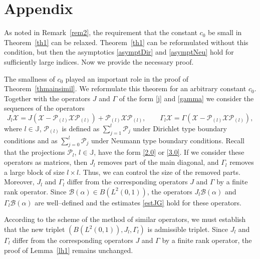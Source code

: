 \documentclass[11pt,centertags,reqno,twoside]{amsart}
\numberwithin{equation}{section}
\theoremstyle{definition}
\theoremstyle{remark}
\begin{document}
\section{Appendix}

As noted in Remark~\ref{rem2}, the requirement that the constant $c_0$ be small in
Theorem~\ref{th1} can be relaxed. Theorem~\ref{th1} can be reformulated without this
condition, but then the asymptotics \eqref{asymptDir} and \eqref{asymptNeu} hold
for sufficiently large indices. Now we provide the necessary proof.

The smallness of $c_0$ played an important role in the proof of Theorem~\ref{thmainsimil}.
We reformulate this theorem for an arbitrary constant $c_0$. Together with
the operators $J$ and $\Gamma$ of the form \eqref{j} and \eqref{gamma} we consider
the sequences of the operators
\[
J_l\mathcal{X}=J(\mathcal{X}-\mathcal{P}_{(l)}\mathcal{X}\mathcal{P}_{(l)})
+\mathcal{P}_{(l)}\mathcal{X}\mathcal{P}_{(l)},
\qquad \Gamma_l\mathcal{X}=\Gamma(\mathcal{X}-\mathcal{P}_{(l)}\mathcal{X}\mathcal{P}_{(l)}),
\]
where $l\in\mathbb{J}$, $\mathcal{P}_{(l)}$ is defined as $\sum_{j=1}^l\mathcal{P}_j$
under Dirichlet type boundary conditions and as $\sum_{j=0}^l\mathcal{P}_j$
under Neumann type boundary conditions. Recall that
the projections $\mathcal{P}_l$, $l\in\mathbb{J}$, have the form \eqref{2.0} or \eqref{3.0}.
If we consider these operators as matrices, then $J_l$ removes part of the main diagonal,
and $\Gamma_l$ removes a large block of size $l\times l$. Thus, we can control the
size of the removed parts. Moreover, $J_l$ and $\Gamma_l$ differ from the
corresponding operators $J$ and $\Gamma$ by a finite rank operator. Since
$\mathcal{B}(\alpha)\in B(L^2(0, 1))$, the operators $J_l\mathcal{B}(\alpha)$
and $\Gamma_l\mathcal{B}(\alpha)$ are well--defined and the estimates \eqref{estJG}
hold for these operators.

According to the scheme of the method of similar operators, we must establish
that the new triplet $(B(L^2(0, 1)), J_l, \Gamma_l)$ is admissible triplet.
Since $J_l$ and $\Gamma_l$ differ from the corresponding operators $J$ and $\Gamma$
by a finite rank operator, the proof of Lemma~\ref{lh1} remains unchanged.
\end{document}
